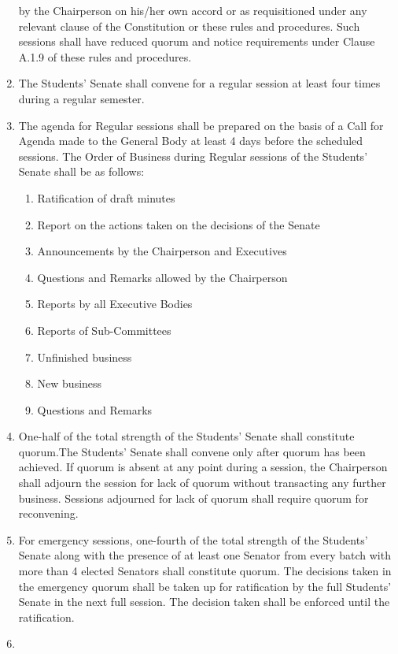 \begin{enumerate}
  by the Chairperson on his/her own accord or as requisitioned under any
  relevant clause of the Constitution or these rules and procedures.
  Such sessions shall have reduced quorum and notice requirements under
  Clause A.1.9 of these rules and procedures.
\item
  The Students' Senate shall convene for a regular session at least four
  times during a regular semester.
\item
  The agenda for Regular sessions shall be prepared on the basis of a
  Call for Agenda made to the General Body at least 4 days before the
  scheduled sessions. The Order of Business during Regular sessions of
  the Students' Senate shall be as follows:

  \begin{enumerate}
  \def\labelenumii{\alph{enumii}.}
  \item
    Ratification of draft minutes
  \item
    Report on the actions taken on the decisions of the Senate
  \item
    Announcements by the Chairperson and Executives
  \item
    Questions and Remarks allowed by the Chairperson
  \item
    Reports by all Executive Bodies
  \item
    Reports of Sub-Committees
  \item
    Unfinished business
  \item
    New business
  \item
    Questions and Remarks
  \end{enumerate}
\item
  One-half of the total strength of the Students' Senate shall
  constitute quorum.The Students' Senate shall convene only after quorum
  has been achieved. If quorum is absent at any point during a session,
  the Chairperson shall adjourn the session for lack of quorum without
  transacting any further business. Sessions adjourned for lack of
  quorum shall require quorum for reconvening.
\item
  For emergency sessions, one-fourth of the total strength of the
  Students' Senate along with the presence of at least one Senator from
  every batch with more than 4 elected Senators shall constitute quorum.
  The decisions taken in the emergency quorum shall be taken up for
  ratification by the full Students' Senate in the next full session.
  The decision taken shall be enforced until the ratification.
\item

\end{enumerate}
